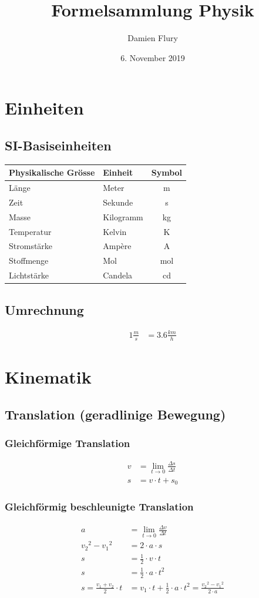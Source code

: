 \documentclass[a4paper]{IEEEtran}
\title{Formelsammlung Physik}
\date{6. November 2019}
\author{Damien Flury}
\begin{document}
  \maketitle
  \section{Einheiten}
  \subsection{SI-Basiseinheiten}
    \begin{tabular}{|l|l|c|}
      \hline
      \textbf{Physikalische Grösse} & \textbf{Einheit} & \textbf{Symbol} \\ \hline \hline
      Länge & Meter & m \\
      Zeit & Sekunde & s \\
      Masse & Kilogramm & kg \\
      Temperatur & Kelvin & K \\
      Stromstärke & Ampère & A \\
      Stoffmenge & Mol & mol \\
      Lichtstärke & Candela & cd \\
      \hline
    \end{tabular}
  \subsection{Umrechnung}
  \begin{align}
    1 \frac{m}{s} &= 3.6 \frac{km}{h}
  \end{align}
  \section{Kinematik}
  \subsection{Translation (geradlinige Bewegung)}
  \subsubsection{Gleichförmige Translation}
  \begin{align}
    v &= \lim_{t \to 0} \frac{\Delta{}s}{\Delta{}t} \\
    s &= v \cdot t + s_0
  \end{align}
  \subsubsection{Gleichförmig beschleunigte Translation}
  \begin{align}
    a &= \lim_{t \to 0} \frac{\Delta{}v}{\Delta{}t} \\
    v_2{}^2 - v_1{}^2 &= 2 \cdot a \cdot s \\
    s &= \frac{1}{2} \cdot v \cdot t \\
    s &= \frac{1}{2} \cdot a \cdot t^2 \\
    s = \frac{v_1 + v_2}{2} \cdot t &= v_1 \cdot t + \frac{1}{2} \cdot a \cdot t^2 = \frac{v_2{}^{2} - v_1{}^2}{2 \cdot a}
  \end{align}
\end{document}
